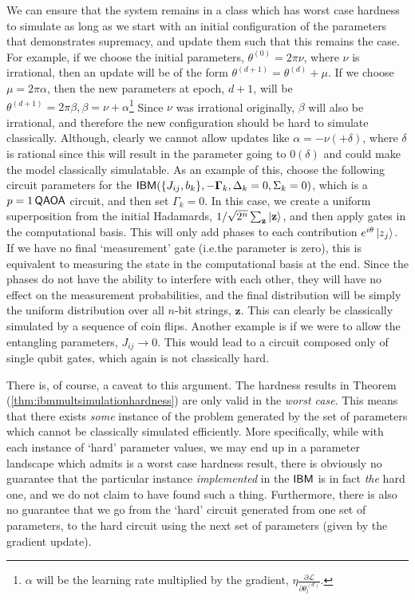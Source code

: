 We can ensure that the system remains in a class which has worst case hardness to simulate as long as we start with an initial configuration of the parameters that demonstrates supremacy, and update them such that this remains the case. For example, if we choose the initial parameters, $\theta^{(0)} = 2\pi\nu$, where $\nu$ is irrational, then an update will be of the form $\theta^{(d+1)} = \theta^{(d)} + \mu$. If we choose $\mu = 2\pi\alpha$, then the new parameters at epoch, $d+1$, will be $\theta^{(d+1)} = 2\pi\beta, \beta = \nu+\alpha$\footnote{$\alpha$ will be the learning rate multiplied by the gradient, $\eta \frac{\partial \mathcal{L}}{\partial \theta^{(d)}_l}$.} Since $\nu$ was irrational originally, $\beta$ will also be irrational, and therefore the new configuration should be hard to simulate classically. Although, clearly we cannot allow updates like $\alpha = -\nu (+ \delta)$, where $\delta$ is rational since this will result in the parameter going to $0 (\delta)$ and could make the model classically simulatable. As an example of this, choose the following circuit parameters for the $\textsf{IBM}(\{J_{ij}, b_k\}, -\mathbf{\Gamma}_k, \Delta_k = 0, \Sigma_k = 0)$, which is a $p=1 \operatorname{\textsf{QAOA}}$ circuit, and then set $\Gamma_k = 0$. In this case, we create a uniform superposition from the initial Hadamards, $1/\sqrt{2^n}\sum_\mathbf{z}\ket{\mathbf{z}}$, and then apply gates in the computational basis. This will only add phases to each contribution $e^{i\theta}\ket{z_j}$. If we have no final `measurement' gate (i.e.\@ the parameter is zero), this is equivalent to measuring the state in the computational basis at the end. Since the phases do not have the ability to interfere with each other, they will have no effect on the measurement probabilities, and the final distribution will be simply the uniform distribution over all $n$-bit strings, $\mathbf{z}$. This can clearly be classically simulated by a sequence of coin flips. Another example is if we were to allow the entangling parameters, $J_{ij} \rightarrow 0$. This would lead to a circuit composed only of single qubit gates, which again is not classically hard.

There is, of course, a caveat to this argument. The hardness results in Theorem (\ref{thm:ibmmultsimulationhardness}) are only valid in the \textit{worst case}. This means that there exists \textit{some} instance of the problem generated by the set of parameters which cannot be classically simulated efficiently. More specifically, while with each instance of `hard' parameter values, we may end up in a parameter landscape which admits is a worst case hardness result, there is obviously no guarantee that the particular instance \textit{implemented} in the $\textsf{IBM}$ is in fact \textit{the} hard one, and we do not claim to have found such a thing. Furthermore, there is also no guarantee that we go from the `hard' circuit generated from one set of parameters, to the hard circuit using the next set of parameters (given by the gradient update).

